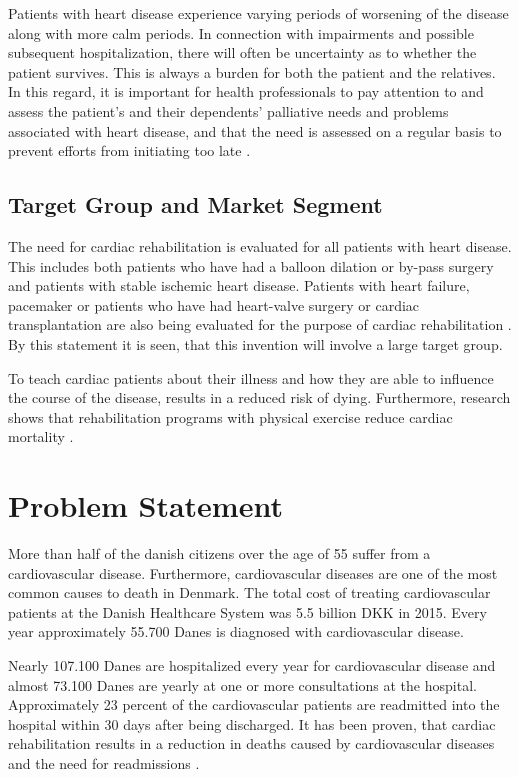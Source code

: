 Patients with heart disease experience varying periods of worsening of the disease along with more calm periods. In connection with impairments and possible subsequent hospitalization, there will often be uncertainty as to whether the patient survives. This is always a burden for both the patient and the relatives. In this regard, it is important for health professionals to pay attention to and assess the patient's and their dependents' palliative needs and problems associated with heart disease, and that the need is assessed on a regular basis to prevent efforts from initiating too late \cite{behandlingsforlob}.



\subsection{Target Group and Market Segment}

The need for cardiac rehabilitation is evaluated for all patients with heart disease. This includes both patients who have had a balloon dilation or by-pass surgery and patients with stable ischemic heart disease.
Patients with heart failure, pacemaker or patients who have had heart-valve surgery or cardiac transplantation are also being evaluated for the purpose of cardiac rehabilitation \cite{Rehabilitering}. By this statement it is seen, that this invention will involve a large target group. 

To teach cardiac patients about their illness and how they are able to influence the course of the disease, results in a reduced risk of dying. Furthermore, research shows that rehabilitation programs with physical exercise reduce cardiac mortality \cite{Hjerteforening}.    


\section{Problem Statement}
More than half of the danish citizens over the age of 55 suffer from a cardiovascular disease. Furthermore, cardiovascular diseases are one of the most common causes to death in Denmark. The total cost of treating cardiovascular patients at the Danish Healthcare System was 5.5 billion DKK in 2015. Every year approximately 55.700 Danes is diagnosed with cardiovascular disease.   

Nearly 107.100 Danes are hospitalized every year for cardiovascular disease and almost 73.100 Danes are yearly at one or more consultations at the hospital. Approximately 23 percent of the cardiovascular patients are readmitted into the hospital within 30 days after being discharged. It has been proven, that cardiac rehabilitation results in a reduction in deaths caused by cardiovascular diseases and the need for readmissions \cite{Hjerteforening}.


